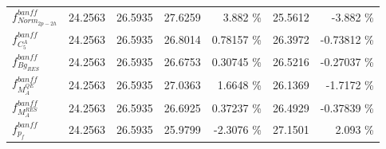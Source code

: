 \begin{table}
\begin{tabular}{| l | r | r | r  r | r  r |}
                                                        $f_{Norm_{2p-2h}}^{banff}$ &         24.2563 & 26.5935 & 27.6259 &           3.882 \%  &         25.5612 &          -3.882 \%  \\ 
                                                         $f_{C^{A}_{5}}^{banff}$ &         24.2563 & 26.5935 & 26.8014 &         0.78157 \%  &         26.3972 &        -0.73812 \%  \\ 
                                                          $f_{Bg_{RES}}^{banff}$ &         24.2563 & 26.5935 & 26.6753 &         0.30745 \%  &         26.5216 &        -0.27037 \%  \\ 
                                                          $f_{M_A^{QE}}^{banff}$ &         24.2563 & 26.5935 & 27.0363 &          1.6648 \%  &         26.1369 &         -1.7172 \%  \\ 
                                                         $f_{M_A^{RES}}^{banff}$ &         24.2563 & 26.5935 & 26.6925 &         0.37237 \%  &         26.4929 &        -0.37839 \%  \\ 
                                                             $f_{p_{f}}^{banff}$ &         24.2563 & 26.5935 & 25.9799 &         -2.3076 \%  &         27.1501 &           2.093 \%  \\ 

\end{tabular}
\end{table}
